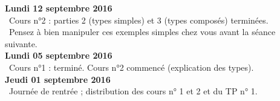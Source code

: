 \documentclass[12pt,a4paper]{article}
\begin{document}
% 
%  
%  
% 
% 

\noindent\textbf{Lundi 12 septembre 2016 }\\
\bu\ Cours n°2 : parties 2 (types simples) et 3 (types composés) terminées. \\
\bu\ Pensez à bien manipuler ces exemples simples chez vous avant la séance suivante. \vspace{.4cm}\\

\noindent\textbf{Lundi 05 septembre 2016 }\\
\bu\ Cours n°1 : terminé. Cours n°2 commencé (explication des types). \vspace{.4cm}\\

\noindent\textbf{Jeudi 01 septembre 2016 }\\
\bu\ Journée de rentrée ; distribution des cours n° 1 et 2 et du TP n° 1. 

\label{end}
\end{document}
